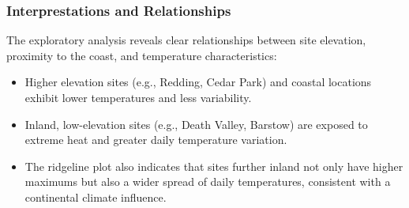 \documentclass[
  11pt,
]{article}
\begin{document}
\subsubsection{Interprestations and
Relationships}\label{interprestations-and-relationships}

The exploratory analysis reveals clear relationships between site
elevation, proximity to the coast, and temperature characteristics:

\begin{itemize}
\item
  Higher elevation sites (e.g., Redding, Cedar Park) and coastal
  locations exhibit lower temperatures and less variability.
\item
  Inland, low-elevation sites (e.g., Death Valley, Barstow) are exposed
  to extreme heat and greater daily temperature variation.
\item
  The ridgeline plot also indicates that sites further inland not only
  have higher maximums but also a wider spread of daily temperatures,
  consistent with a continental climate influence.
\end{itemize}
\end{document}
